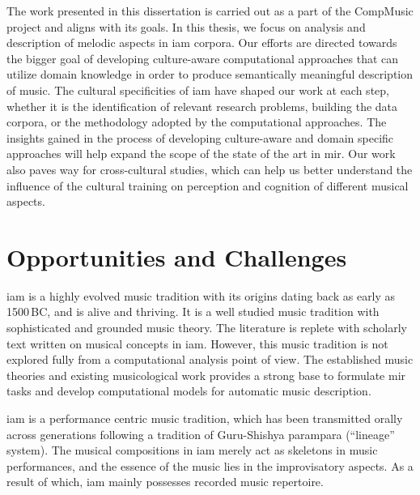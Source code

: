 The work presented in this dissertation is carried out as a part of the CompMusic project and aligns with its goals. In this thesis, we focus on analysis and description of melodic aspects in \gls{iam} corpora. Our efforts are directed towards the bigger goal of developing culture-aware computational approaches that can utilize domain knowledge in order to produce semantically meaningful description of music. The cultural specificities of \gls{iam} have shaped our work at each step, whether it is the identification of relevant research problems, building the data corpora, or the methodology adopted by the computational approaches. The insights gained in the process of developing culture-aware and domain specific approaches will help expand the scope of the state of the art in \gls{mir}. Our work also paves way for cross-cultural studies, which can help us better understand the influence of the cultural training on perception and cognition of different musical aspects.



\section{Opportunities and Challenges}
\label{sec:challenges_opportunities}

\gls{iam} is a highly evolved music tradition with its origins dating back as early as 1500\,BC, and is alive and thriving. It is a well studied music tradition with sophisticated and grounded music theory. The literature is replete with scholarly text written on musical concepts in \gls{iam}. However, this music tradition is not explored fully from a computational analysis point of view. The established music theories and existing musicological work provides a strong base to formulate \gls{mir} tasks and develop computational models for automatic music description.

\gls{iam} is a performance centric music tradition, which has been transmitted orally across generations following a tradition of Guru-Shishya parampara (``lineage'' system). The musical compositions in \gls{iam} merely act as skeletons in music performances, and the essence of the music lies in the improvisatory aspects. As a result of which, \gls{iam} mainly possesses recorded music repertoire. 

